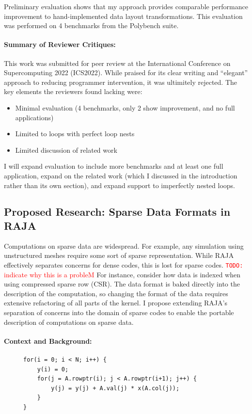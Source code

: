 \documentclass{article}
\newcommand{\todo}[1]{{\textcolor{red}{{\tt{TODO:}}\,\,#1 }}}
\begin{document}
Preliminary evaluation shows that my approach provides comparable performance improvement to hand-implemented data layout transformations. 
This evaluation was performed on 4 benchmarks from the Polybench suite. 

\paragraph{Summary of Reviewer Critiques:}

This work was submitted for peer review at the International Conference on Supercomputing 2022 (ICS2022). 
While praised for its clear writing and \enquote{elegant} approach to reducing programmer intervention, it was ultimitely rejected.
The key elements the reviewers found lacking were:
\begin{itemize}
\item Minimal evaluation (4 benchmarks, only 2 show improvement, and no full applications)
\item Limited to loops with perfect loop nests
\item Limited discussion of related work
\end{itemize}
I will expand evaluation to include more benchmarks and at least one full application, expand on the related work (which I discussed in the introduction rather than its own section), and expand support to imperfectly nested loops.

\subsection{Proposed Research: Sparse Data Formats in RAJA}

Computations on sparse data are widespread. 
For example, any simulation using unstructured meshes require some sort of sparse representation.
While RAJA effectively separates concerns for dense codes, this is lost for sparse codes.
\todo{indicate why this is a probleM}
For instance, consider how data is indexed when using compressed sparse row (CSR). 
The data format is baked directly into the description of the computation, so changing the format of the data requires extensive refactoring of all parts of the kernel.
I propose extending RAJA's separation of concerns into the domain of sparse codes to enable the portable description of computations on sparse data.

\paragraph{Context and Background:}
\begin{figure}
\begin{lstlisting}[caption={CSR-stored sparse matrix vector multiplication},label={SpMVCSR}]
for(i = 0; i < N; i++) {
    y(i) = 0;
    for(j = A.rowptr(i); j < A.rowptr(i+1); j++) {
        y(j) = y(j) + A.val(j) * x(A.col(j));
    }
}
\end{lstlisting}
\end{figure}
\end{document}
